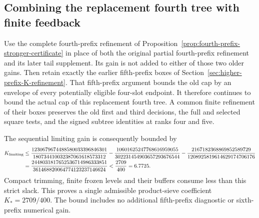 \documentclass[11pt]{article}
\begin{document}
\subsection{Combining the replacement fourth tree with finite feedback}
\label{sec:stronger-fourth-finite-seed-corollary}

Use the complete fourth-prefix refinement of
Proposition~\ref{prop:fourth-prefix-stronger-certificate} in place
of both the original partial fourth-prefix refinement and its
later tail supplement. Its gain is not added to either of those
two older gains. Then retain exactly the earlier fifth-prefix
boxes of Section~\ref{sec:higher-prefix-K-refinement}.
That fifth-prefix argument bounds the old cap by an envelope of
every potentially eligible four-slot endpoint. It therefore
continues to bound the actual cap of this replacement fourth tree.
A common finite refinement of their boxes preserves the old first
and third decisions, the full and selected square tests, and the
signed subtree identities at ranks four and five.

The sequential limiting gain is consequently bounded by
\begin{align*}
 K_{\rm limiting}
 &\le\frac{1230679674488580033396846301}
              {180734410032387061618573312}
 -\frac{10601625247768616959055}{302231454903657293676544}
 -\frac{2167182368869852589729}{1208925819614629174706176}\\
 &=\frac{2448031817652536714986333851}
          {361468820064774123237146624}
 <\frac{2709}{400}=6.7725.
\end{align*}
Compact trimming, finite frozen levels and their buffers consume
less than this strict slack. This proves a single admissible
product-sieve coefficient $K_*=2709/400$. The bound includes no
additional fifth-prefix diagnostic or sixth-prefix numerical gain.
\end{document}
